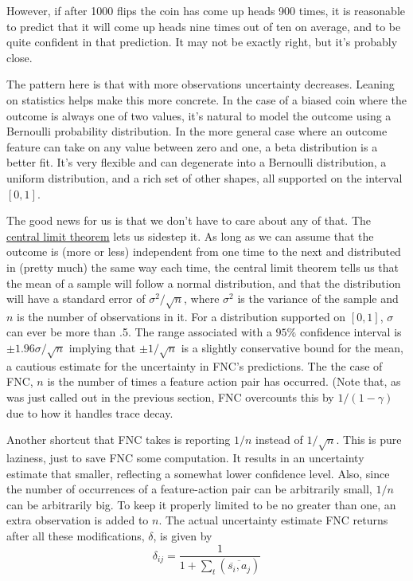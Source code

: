 However, if after 1000 flips the coin has come up heads 900 times, it is
reasonable to predict that it will come up heads nine times out of ten on average,
and to be quite confident in that prediction. It may not be exactly right,
but it’s probably close.

The pattern here is that with more observations uncertainty decreases.
Leaning on statistics helps make this more concrete. In the case of a
biased coin where the outcome is always one of two values, it's natural to
model the outcome using a Bernoulli probability distribution. In the more
general case where an outcome feature can take on any value between
zero and one, a beta distribution is a better fit. It’s very flexible and
can degenerate into a Bernoulli distribution, a uniform distribution,
and a rich set of other shapes, all supported on the interval $[0, 1]$.

The good news for us is that we don’t have to care about any of that.
The \href{https://en.wikipedia.org/wiki/Central_limit_theorem}
{central limit theorem} lets us sidestep it. As long as we can assume that
the outcome is (more or less) independent from one time to the next and
distributed in (pretty much) the same way each time, the central limit
theorem tells us that the mean of a sample will follow a normal distribution,
and that the distribution will have a standard error of
$\sigma^2 / \sqrt{n}$, where $\sigma^2$ is the variance of the sample and
$n$ is the number of observations in it. For a distribution supported on 
$[0, 1]$, $\sigma$ can ever be more than .5. The range
associated with a $95\%$ confidence interval is $\pm 1.96 \sigma / \sqrt{n}$
implying that $\pm 1 / \sqrt{n}$ is a slightly conservative bound for the mean,
a cautious estimate for the uncertainty in FNC's predictions. The the case of
FNC, $n$ is the number of times a feature action pair has occurred.
(Note that, as was just called out in the previous section, FNC overcounts
this by $1 / (1 - \gamma)$ due to how it handles trace decay.

Another shortcut that FNC takes is reporting $1 / n$ instead of $1 / \sqrt{n}$.
This is pure laziness, just to save FNC some computation.
It results in an uncertainty
estimate that smaller, reflecting a somewhat lower confidence level.
Also, since 
the number of occurrences of a feature-action pair can be arbitrarily small,
$1/n$ can be arbitrarily big. To keep it properly limited to be no greater than
one, an extra observation is added to $n$. The actual uncertainty estimate FNC
returns after all these modifications, $\delta$, is given by
\begin{equation}
\delta_{ij} = \frac{1}{1 + \sum_t(\overline{\overline{s_i}, a_j})}
\end{equation}

